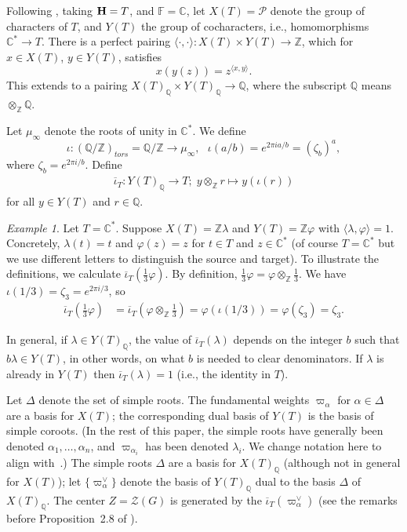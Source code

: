 \documentclass[reqno,11pt]{amsart}
\theoremstyle{remark}
\theoremstyle{remark}
\newtheorem{example}[Thm]{Example}
\theoremstyle{definition}
\theoremstyle{definition}
\theoremstyle{definition}
\numberwithin{equation}{section}
\newcommand{\C}{\mathbb{C}}           %
\newcommand{\Z}{\mathbb{ Z}}           %
\newcommand{\QQ}{\mathbb{ Q}}        %
\newcommand{\ga}{\alpha}
\newcommand{\gD}{\Delta}
\newcommand{\cp}{\mathcal{P}}
\newcommand{\cz}{\mathcal{Z}}
\def\ibarT{\overline{\iota}_T}
\begin{document}
Following \cite[\S 1.A]{Bonnafe2004}, taking ${\bf H} = T$, and ${\mathbb F} = \C$, let $X(T) = \cp$ denote the group of characters of $T$, and $Y(T)$ the group of cocharacters, i.e., homomorphisms $\C^* \to T$. 
There is a perfect pairing $\langle \cdot, \cdot \rangle: X(T) \times Y(T) \to \Z$, which for $x \in X(T)$, $y \in Y(T)$,
satisfies
$$
x( y(z) ) = z^{\langle x, y \rangle}.
$$
This extends to a pairing $X(T)_{\QQ} \times Y(T)_{\QQ} \to \QQ$, where the subscript $\QQ$ means $\otimes_{\Z} \QQ$.

Let $\mu_{\infty}$ denote the roots of unity in $\C^*$.  We define
$$
\iota: (\QQ/ \Z)_{tors} = \QQ/ \Z \to \mu_{\infty}, \ \ \ \iota(a/b) = e^{2 \pi i a/b} = (\zeta_b)^a,
$$
where $\zeta_b =  e^{2 \pi i /b}$. Define
\begin{align*}
\ibarT: Y(T)_\QQ \to T ; \; y \otimes_{\Z} r \mapsto y(\iota (r))
\end{align*}
for all $y\in Y(T)$ and $r\in \QQ$.

\begin{example} \label{ex.B1}
Let $T = \C^*$.  Suppose $X(T) = \Z \lambda$ and $Y(T) = \Z \varphi$ with $\langle \lambda, \varphi \rangle = 1$.
Concretely, $\lambda(t) = t$ and $\varphi(z) = z$ for $t \in T$ and $z \in \C^*$ (of course $T = \C^*$ but we use different letters to distinguish the source and target). 
To illustrate the definitions, we calculate $\ibarT\left(\frac{1}{3} \varphi\right)$.  By definition, $\frac{1}{3} \varphi = \varphi \otimes_{\Z} \frac{1}{3}$.
We have $\iota(1/3) = \zeta_3 = e^{2 \pi i/3}$, so
\begin{align*}
\ibarT\left(\frac{1}{3} \varphi\right) & =  \ibarT\left(\varphi \otimes_{\Z} \frac{1}{3}\right) = \varphi(\iota (1/3)) = \varphi(\zeta_3) = \zeta_3.
\end{align*}
\end{example}

In general, if $\lambda \in Y(T)_{\QQ}$, the value of $\ibarT(\lambda)$ depends on the integer $b$ such that $b \lambda \in Y(T)$, in other words, on what $b$ is needed to clear denominators.  
If $\lambda$ is already in $Y(T)$ then $\ibarT(\lambda) = 1$ (i.e., the identity in $T$).

Let $\gD$ denote the set of simple roots.
The fundamental weights $\varpi_{\ga}$ for $\ga \in \gD$ are a basis for $X(T)$; the corresponding dual basis of $Y(T)$ is the basis of simple coroots.  (In the rest of this paper, the simple roots have generally been denoted $\ga_1, \ldots, \ga_n$, and $\varpi_{\ga_i}$ has
been denoted $\lambda_i$. We change notation here to align with~\cite{Bonnafe2004}.)
The simple roots $\gD$ are a basis for $X(T)_{\QQ}$ (although not in general for $X(T)$); 
let $\{ \varpi^{\vee}_{\ga} \}$ denote the basis of $Y(T)_{\QQ}$ dual to the basis $\gD$ of $X(T)_{\QQ}$. 
The center $Z=\cz(G)$ is generated by the $\ibarT(\varpi^{\vee}_{\ga} )$ (see the remarks before Proposition~2.8 of \cite{Bonnafe2004}).
\end{document}
